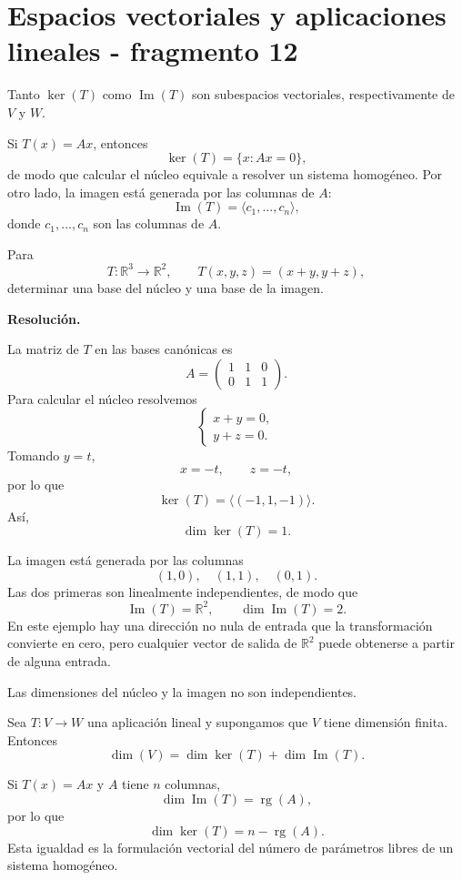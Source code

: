 \section{Espacios vectoriales y aplicaciones lineales - fragmento 12}
Tanto $\ker(T)$ como $\operatorname{Im}(T)$ son subespacios vectoriales, respectivamente de $V$ y $W$.

Si $T(x)=Ax$, entonces
\[
\ker(T)=\{x:Ax=0\},
\]
de modo que calcular el núcleo equivale a resolver un sistema homogéneo. Por otro lado, la imagen está generada por las columnas de $A$:
\[
\operatorname{Im}(T)
=
\langle c_1,\ldots,c_n\rangle,
\]
donde $c_1,\ldots,c_n$ son las columnas de $A$.

\begin{solvedexercise}
Para
\[
T:\mathbb{R}^3\longrightarrow\mathbb{R}^2,
\qquad
T(x,y,z)=(x+y,y+z),
\]
determinar una base del núcleo y una base de la imagen.

\textbf{Resolución.}\par\smallskip
La matriz de $T$ en las bases canónicas es
\[
A=
\begin{pmatrix}
1&1&0\\
0&1&1
\end{pmatrix}.
\]
Para calcular el núcleo resolvemos
\[
\begin{cases}
x+y=0,\\
y+z=0.
\end{cases}
\]
Tomando $y=t$,
\[
x=-t,
\qquad
z=-t,
\]
por lo que
\[
\ker(T)=\langle(-1,1,-1)\rangle.
\]
Así,
\[
\boxed{\dim\ker(T)=1.}
\]

La imagen está generada por las columnas
\[
(1,0),\quad(1,1),\quad(0,1).
\]
Las dos primeras son linealmente independientes, de modo que
\[
\operatorname{Im}(T)=\mathbb{R}^2,
\qquad
\boxed{\dim\operatorname{Im}(T)=2.}
\]
En este ejemplo hay una dirección no nula de entrada que la transformación convierte en cero, pero cualquier vector de salida de $\mathbb{R}^2$ puede obtenerse a partir de alguna entrada.
\end{solvedexercise}

Las dimensiones del núcleo y la imagen no son independientes.

\begin{theorem}
Sea $T:V\to W$ una aplicación lineal y supongamos que $V$ tiene dimensión finita. Entonces
\[
\boxed{
\dim(V)=\dim\ker(T)+\dim\operatorname{Im}(T).
}
\]
\end{theorem}

Si $T(x)=Ax$ y $A$ tiene $n$ columnas,
\[
\dim\operatorname{Im}(T)=\operatorname{rg}(A),
\]
por lo que
\[
\boxed{
\dim\ker(T)=n-\operatorname{rg}(A).
}
\]
Esta igualdad es la formulación vectorial del número de parámetros libres de un sistema homogéneo.


